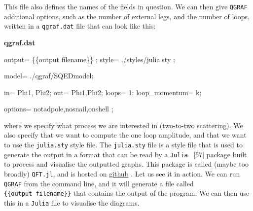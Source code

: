\documentclass[
  11pt,
  a4paper,
  DIV=11,
  numbers=noendperiod,
  twoside]{scrreprt}
\newenvironment{Shaded}{\begin{snugshade}}{\end{snugshade}}
\newcommand{\NormalTok}[1]{\textcolor[rgb]{0.00,0.23,0.31}{#1}}
\DeclareRobustCommand{\[}{\begin{equation}}
\DeclareRobustCommand{\]}{\end{equation}}
\begin{document}
This file also defines the names of the fields in question. We can then
give \texttt{QGRAF} additional options, such as the number of external
legs, and the number of loops, written in a \texttt{qgraf.dat} file that
can look like this:

\textbf{qgraf.dat}

\begin{Shaded}
\begin{Highlighting}[]
\NormalTok{output= \textquotesingle{}\{\{output filename\}\}\textquotesingle{} ;}
\NormalTok{style= \textquotesingle{}./styles/julia.sty\textquotesingle{} ; }

\NormalTok{model= \textquotesingle{}./qgraf/SQEDmodel\textquotesingle{};}

\NormalTok{in= Phi1,  Phi2;}
\NormalTok{out= Phi1,Phi2;}
\NormalTok{loops= 1;}
\NormalTok{loop\_momentum= k;}

\NormalTok{options=  notadpole,nosnail,onshell ;}
\end{Highlighting}
\end{Shaded}

where we specify what process we are interested in (two-to-two
scattering). We also specify that we want to compute the one loop
amplitude, and that we want to use the \texttt{julia.sty} style file.
The \texttt{julia.sty} file is a style file that is used to generate the
output in a format that can be read by a \texttt{Julia}
~{[}\protect\hyperlink{ref-Bezanson:2015}{57}{]} package built to
process and visualise the outputted graphs. This package is called
(maybe too broadly) \texttt{QFT.jl}, and is hosted on
\href{https://github.com/lcnhb/QFT.jl}{github} . Let us see it in
action. We can run \texttt{QGRAF} from the command line, and it will
generate a file called \texttt{\{\{output\ filename\}\}} that contains
the output of the program. We can then use this in a \texttt{Julia} file
to visualise the diagrams.
\end{document}
